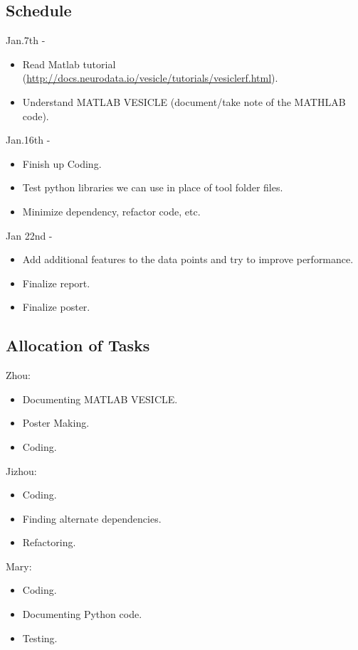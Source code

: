 \documentclass[11pt]{article} %
\begin{document}
\subsection{Schedule}
Jan.7th - 
\begin{itemize}
	\item Read Matlab tutorial (\url{http://docs.neurodata.io/vesicle/tutorials/vesiclerf.html}).
	\item Understand MATLAB VESICLE (document/take note of the MATHLAB code).
\end{itemize}
Jan.16th - 
\begin{itemize}
	\item Finish up Coding.
	\item	Test python libraries we can use in place of tool folder files.
	\item Minimize dependency, refactor code, etc.
\end{itemize}
Jan 22nd -
\begin{itemize}
	\item Add additional features to the data points and try to improve performance.
	\item Finalize report.
	\item Finalize poster.
\end{itemize}

\subsection{Allocation of Tasks}
Zhou:
\begin{itemize}
	\item Documenting MATLAB VESICLE.
	\item Poster Making.
	\item Coding.
\end{itemize}
Jizhou:
\begin{itemize}
	\item Coding.
	\item Finding alternate dependencies.
	\item Refactoring.
\end{itemize}
Mary:
\begin{itemize}
	\item Coding.
	\item Documenting Python code.
	\item Testing.
\end{itemize}
{}

\end{document}
